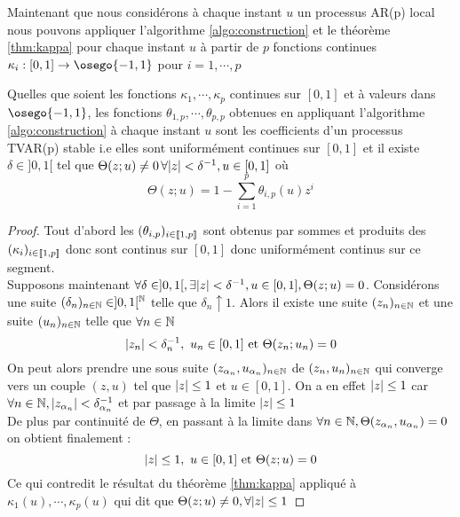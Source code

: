 \documentclass{report}
\begin{document}
Maintenant que nous considérons à chaque instant $u$ un processus AR(p) local nous pouvons appliquer l'algorithme \ref{algo:construction} et le théorème \ref{thm:kappa} pour chaque instant $u$ à partir de $p$ fonctions continues $\kappa_i :[0,1] \to \osego{-1,1}$ pour $i=1,\cdots,p$
\begin{Thm}
\label{thm:kappa_u}
Quelles que soient les fonctions $\kappa_1, \cdots, \kappa_p$ continues sur $[0,1]$ et à valeurs dans $\osego{-1,1}$, les fonctions $\theta_{1,p},\cdots, \theta_{p,p}$ obtenues en appliquant l'algorithme \ref{algo:construction} à chaque instant $u$ sont les coefficients d'un processus TVAR(p) stable i.e elles sont uniformément continues sur $[0,1]$ et il existe $\delta \in ]0,1[$ tel que $\Theta(z;u)\neq 0 \, \forall { \left| z \right|} < \delta^{-1}, u\in [0,1]$ où 
\[
\Theta(z;u) = 1 - \sum_{i=1}^p \theta_{i,p}(u) z^i
\]
\end{Thm}
\begin{proof} 
Tout d'abord les $(\theta_{i,p})_{i\in { \left\llbracket 1,p \right\rrbracket}}$ sont obtenus par sommes et produits des $(\kappa_i)_{i\in { \left\llbracket 1,p \right\rrbracket}}$ donc sont continus sur $[0,1]$ donc uniformément continus sur ce segment. \\
Supposons maintenant $\forall \delta \in ]0,1[, \exists { \left| z \right|} < \delta^{-1}, u\in [0,1], \Theta(z;u) = 0$. Considérons une suite $(\delta_n)_{n\in \mathbb{N}} \in ]0,1[^{\mathbb{N}}$ telle que $\delta_n \uparrow 1$. Alors il existe une suite $(z_n)_{n\in \mathbb{N}}$ et une suite $(u_n)_{n\in \mathbb{N}}$ telle que $\forall n \in \mathbb{N}$
$$
{ \left| z_n \right|} < \delta_n^{-1},
\,\,
u_n \in [0,1] 
\mbox{ et }
\Theta(z_n;u_n) = 0
$$
On peut alors prendre une sous suite $(z_{\alpha_n}, u_{\alpha_n})_{n\in \mathbb{N}}$ de $(z_n,u_n)_{n\in \mathbb{N}}$ qui converge vers un couple $(z,u)$ tel que ${ \left| z \right|} \leq 1$ et $u\in [0,1]$. On a en effet ${ \left| z \right|} \leq 1$ car $\forall n\in \mathbb{N}, { \left| z_{\alpha_n} \right|} < \delta_{\alpha_n}^{-1}$ et par passage à la limite ${ \left| z \right|} \leq 1$ \\
De plus par continuité de $\Theta$, en passant à la limite dans $\forall n\in \mathbb{N}, \Theta(z_{\alpha_n}, u_{\alpha_n}) = 0$ on obtient finalement :
$$
{ \left| z \right|} \leq 1,
\,\,
u \in [0,1] 
\mbox{ et }
\Theta(z;u) = 0
$$
Ce qui contredit le résultat du théorème \ref{thm:kappa} appliqué à $\kappa_1(u),\cdots,\kappa_p(u)$ qui dit que $\Theta(z;u) \neq 0, \forall { \left| z \right|}\leq 1$
\end{proof}
\end{document}
